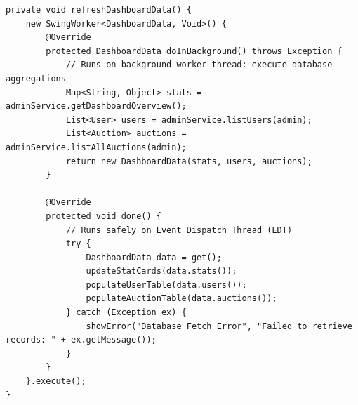 \begin{lstlisting}[caption={Asynchronous Database Query Execution via \texttt{SwingWorker}}, label={lst:swing_worker}]
private void refreshDashboardData() {
    new SwingWorker<DashboardData, Void>() {
        @Override
        protected DashboardData doInBackground() throws Exception {
            // Runs on background worker thread: execute database aggregations
            Map<String, Object> stats = adminService.getDashboardOverview();
            List<User> users = adminService.listUsers(admin);
            List<Auction> auctions = adminService.listAllAuctions(admin);
            return new DashboardData(stats, users, auctions);
        }

        @Override
        protected void done() {
            // Runs safely on Event Dispatch Thread (EDT)
            try {
                DashboardData data = get();
                updateStatCards(data.stats());
                populateUserTable(data.users());
                populateAuctionTable(data.auctions());
            } catch (Exception ex) {
                showError("Database Fetch Error", "Failed to retrieve records: " + ex.getMessage());
            }
        }
    }.execute();
}
\end{lstlisting}

